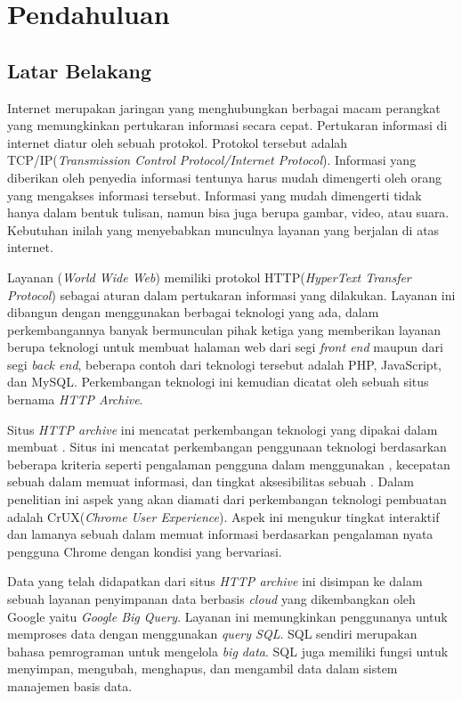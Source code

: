 \chapter{Pendahuluan}
\label{chap:intro}
   
\section{Latar Belakang}
\label{sec:label}

Internet merupakan jaringan yang menghubungkan berbagai macam perangkat yang memungkinkan pertukaran informasi secara cepat. Pertukaran informasi di internet diatur oleh sebuah protokol. Protokol tersebut adalah TCP/IP(\textit{Transmission Control Protocol/Internet Protocol}). Informasi yang diberikan oleh penyedia informasi tentunya harus mudah dimengerti oleh orang yang mengakses informasi tersebut. Informasi yang mudah dimengerti tidak hanya dalam bentuk tulisan, namun bisa juga berupa gambar, video, atau suara. Kebutuhan inilah yang menyebabkan munculnya layanan \web yang berjalan di atas internet.

Layanan \web(\textit{World Wide Web}) memiliki protokol HTTP(\textit{HyperText Transfer Protocol}) sebagai aturan dalam pertukaran informasi yang dilakukan. Layanan \web ini dibangun dengan menggunakan berbagai teknologi yang ada, dalam perkembangannya banyak bermunculan pihak ketiga yang memberikan layanan berupa teknologi untuk membuat halaman web dari segi \textit{front end} maupun dari segi \textit{back end}, beberapa contoh dari teknologi tersebut adalah PHP, JavaScript, dan MySQL. Perkembangan teknologi ini kemudian dicatat oleh sebuah situs bernama \textit{HTTP Archive}.

Situs \web \textit{HTTP archive} ini mencatat perkembangan teknologi yang dipakai dalam membuat \web. Situs ini mencatat perkembangan penggunaan teknologi berdasarkan beberapa kriteria seperti pengalaman pengguna dalam menggunakan \web, kecepatan sebuah \web dalam memuat informasi, dan tingkat aksesibilitas sebuah \web. Dalam penelitian ini aspek yang akan diamati dari perkembangan teknologi pembuatan \web adalah CrUX(\textit{Chrome User Experience}). Aspek ini mengukur tingkat interaktif dan lamanya sebuah \web dalam memuat informasi berdasarkan pengalaman nyata pengguna Chrome dengan kondisi yang bervariasi.

Data yang telah didapatkan dari situs \web \textit{HTTP archive} ini disimpan ke dalam sebuah layanan penyimpanan data berbasis \textit{cloud} yang dikembangkan oleh Google yaitu \textit{Google Big Query}. Layanan ini memungkinkan penggunanya untuk memproses data dengan menggunakan \textit{query SQL}. SQL sendiri merupakan bahasa pemrograman untuk mengelola \textit{big data}. SQL juga memiliki fungsi untuk menyimpan, mengubah, menghapus, dan mengambil data dalam sistem manajemen basis data.


